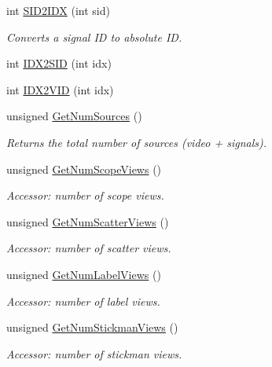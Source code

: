 \begin{CompactItemize}
int \hyperlink{class_main_window_1689a151f6cab2d4c2ffa7f9ae1a6adc}{SID2IDX} (int sid)
\begin{CompactList}\small\item\em Converts a signal ID to absolute ID. \item\end{CompactList}\item 
int \hyperlink{class_main_window_1bd42b6c8b94406016d733a66b555d04}{IDX2SID} (int idx)
\item 
int \hyperlink{class_main_window_37742f5f7a8b4319c4f6cf5f66c190f0}{IDX2VID} (int idx)
\item 
unsigned \hyperlink{class_main_window_dafc0a3e5912b3edf5da3ca827d47d16}{GetNumSources} ()
\begin{CompactList}\small\item\em Returns the total number of sources (video + signals). \item\end{CompactList}\item 
unsigned \hyperlink{class_main_window_e66063bfcc69ac8b8417d2cae19a14da}{GetNumScopeViews} ()
\begin{CompactList}\small\item\em Accessor: number of scope views. \item\end{CompactList}\item 
unsigned \hyperlink{class_main_window_d060f735f7bcf9fe216439a81b5a8633}{GetNumScatterViews} ()
\begin{CompactList}\small\item\em Accessor: number of scatter views. \item\end{CompactList}\item 
unsigned \hyperlink{class_main_window_dee4d94e40db731d249acf5d75779a61}{GetNumLabelViews} ()
\begin{CompactList}\small\item\em Accessor: number of label views. \item\end{CompactList}\item 
unsigned \hyperlink{class_main_window_35bf36017389eb376f4628a50b472bc2}{GetNumStickmanViews} ()
\begin{CompactList}\small\item\em Accessor: number of stickman views. \item\end{CompactList}\item 

\end{CompactItemize}
